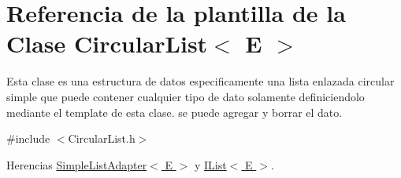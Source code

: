 \hypertarget{classCircularList}{\section{Referencia de la plantilla de la Clase Circular\-List$<$ E $>$}
\label{classCircularList}
}


Esta clase es una estructura de datos especificamente una lista enlazada circular simple que puede contener cualquier tipo de dato solamente definiciendolo mediante el template de esta clase. se puede agregar y borrar el dato.  




{\ttfamily \#include $<$Circular\-List.\-h$>$}



Herencias \hyperlink{classSimpleListAdapter}{Simple\-List\-Adapter$<$ E $>$} y \hyperlink{classIList}{I\-List$<$ E $>$}.

